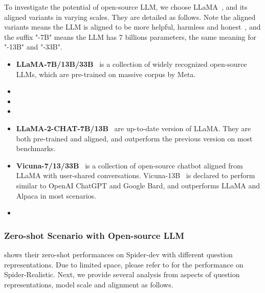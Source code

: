 To investigate the potential of open-source LLM, we choose LLaMA~\cite{llama}, and its aligned variants in varying scales. 
They are detailed as follows. 
Note the aligned variants means the LLM is aligned to be more helpful, harmless and honest~\cite{hhh}, 
and the suffix "-7B" means the LLM has 7 billions parameters, the same meaning for "-13B" and "-33B".
\begin{itemize}
    \item \textbf{LLaMA-7B/13B/33B}~\cite{llama} is a collection of widely recognized open-source LLMs, which are pre-trained on massive corpus by Meta.
    \item {}
	\item {} 
	\item {} 
    \item \textbf{LLaMA-2-CHAT-7B/13B}~\cite{llama2} are up-to-date version of LLaMA. 
    They are both pre-trained and aligned, and outperform the previous version on most benchmarks. 
	\item \textbf{Vicuna-7/13/33B}~\cite{vicuna, vicuna2023} is a collection of open-source chatbot aligned from LLaMA with user-shared conversations. 
    Vicuna-13B~\cite{vicuna2023} is declared to perform similar to OpenAI ChatGPT and Google Bard, and outperforms LLaMA and Alpaca in most scenarios. 
        \item {} 
\end{itemize}

\subsubsection{Zero-shot Scenario with Open-source LLM}

 shows their zero-shot performances on Spider-dev with different question representations. 
Due to limited space, please refer to  for the performance on Spider-Realistic.
Next, we provide several analysis from aspects of question representations, model scale and alignment as follows. 

